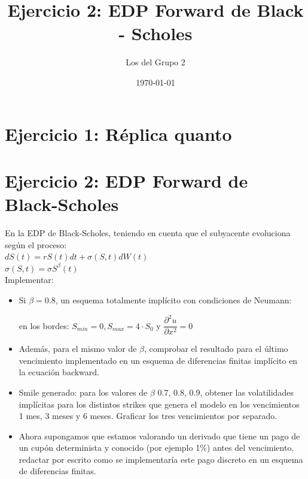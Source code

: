 \documentclass[titlepage, 10pt,]{article}
\title{Ejercicio 2: EDP Forward de Black - Scholes}
\author{Los del Grupo 2}
\date{\today}
\begin{document}
\maketitle


\section{Ejercicio 1: Réplica quanto}


\section{Ejercicio 2: EDP Forward de Black-Scholes}

En la EDP de Black-Scholes, teniendo en cuenta que el subyacente evoluciona según el proceso: \\

$dS(t) = rS(t)dt + \sigma(S,t)dW(t)$ \\

$\sigma(S,t) = \sigma S^{\beta}(t)$  \\

Implementar: \\

\begin{itemize}
	\item Si $\beta = 0.8$, un esquema totalmente implícito con condiciones de Neumann: \\
		\begin{center}
			en los bordes: $S_{min} = 0, S_{max} = 4 \cdot S_{0}$ y $\dfrac{\partial^{2}u}{\partial{x}^{2}} = 0$
		\end{center}
		
	\item Además, para el mismo valor de $\beta$, comprobar el resultado para el último vencimiento implementado en un esquema de diferencias finitas implícito en la ecuación backward.
	
	\item Smile generado: para los valores de $\beta$ 0.7, 0.8, 0.9, obtener las volatilidades implícitas para los distintos strikes que genera el modelo en los vencimientos 1 mes, 3 meses y 6 meses. Graficar los tres vencimientos por separado.
	
	\item Ahora supongamos que estamos valorando un derivado que tiene un pago de un cupón determinista y conocido (por ejemplo 1$\%$) antes del vencimiento, redactar por escrito como se implementaría este pago discreto en un esquema de diferencias finitas.	
\end{itemize}
\end{document}
